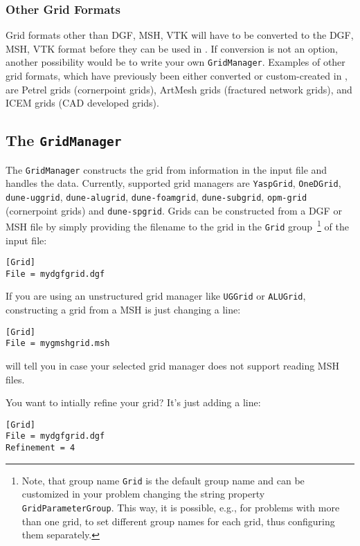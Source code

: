 \subsubsection{Other Grid Formats}
Grid formats other than DGF, MSH, VTK will have to be converted to the DGF, MSH, VTK format before they can be used in \Dumux.
If conversion is not an option, another possibility would be to write your own \texttt{GridManager}. Examples of other grid formats,
which have previously been either converted or custom-created in \Dumux, are Petrel grids (cornerpoint grids),
ArtMesh grids (fractured network grids), and ICEM grids (CAD developed grids).

\subsection{The \Dumux \texttt{GridManager}}
The \Dumux \texttt{GridManager} constructs the grid from information in the input file and handles the data.
Currently, supported grid managers are \texttt{YaspGrid}, \texttt{OneDGrid}, \texttt{dune-uggrid}, \texttt{dune-alugrid}, \texttt{dune-foamgrid}, \texttt{dune-subgrid}, \texttt{opm-grid} (cornerpoint grids) and \texttt{dune-spgrid}.
Grids can be constructed from a DGF or MSH file by simply providing the filename to the grid in the \texttt{Grid} group~\footnote{Note,
that group name \texttt{Grid} is the default group name and can be customized in your problem changing the string property \texttt{GridParameterGroup}.
This way, it is possible, e.g., for problems with more than one grid, to set different group names for each grid, thus configuring them separately.}
of the input file:
\begin{lstlisting}[style=DumuxParameterFile]
[Grid]
File = mydgfgrid.dgf
\end{lstlisting}

If you are using an unstructured grid manager like \texttt{UGGrid} or \texttt{ALUGrid}, constructing a grid from a MSH is just changing a line:
\begin{lstlisting}[style=DumuxParameterFile]
[Grid]
File = mygmshgrid.msh
\end{lstlisting}
\Dumux will tell you in case your selected grid manager does not support reading MSH files.

You want to intially refine your grid? It's just adding a line:
\begin{lstlisting}[style=DumuxParameterFile]
[Grid]
File = mydgfgrid.dgf
Refinement = 4
\end{lstlisting}

